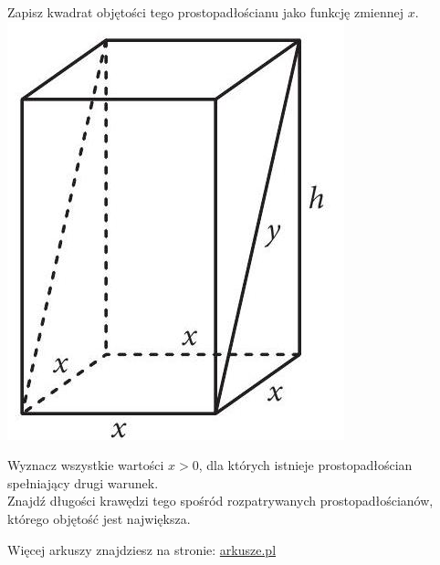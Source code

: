 \documentclass[10pt]{article}
\begin{document}
Zapisz kwadrat objętości tego prostopadłościanu jako funkcję zmiennej \(x\).\\
\includegraphics[max width=\textwidth, center]{2024_11_21_5abc0108fbbc287103ecg-18}

Wyznacz wszystkie wartości \(x>0\), dla których istnieje prostopadłościan spełniający drugi warunek.\\
Znajdź długości krawędzi tego spośród rozpatrywanych prostopadłościanów, którego objętość jest największa.

Więcej arkuszy znajdziesz na stronie: \href{http://arkusze.pl}{arkusze.pl}
\end{document}
